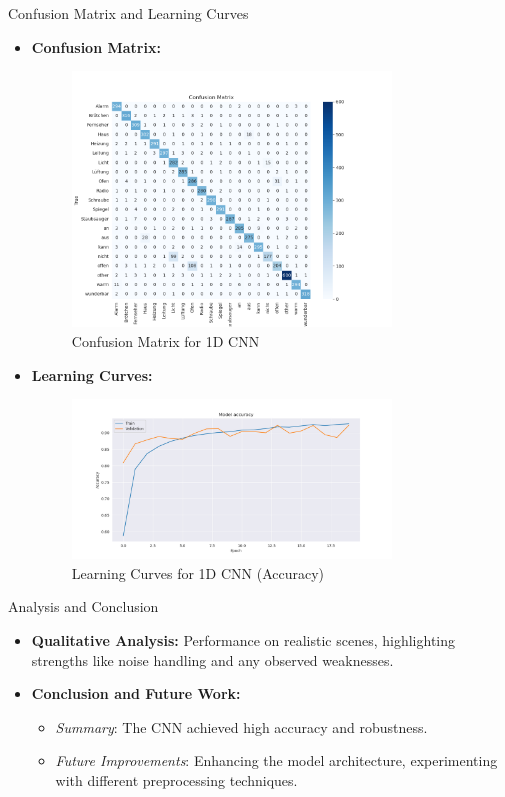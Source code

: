 \documentclass{beamer}
\begin{document}
\begin{frame}{Confusion Matrix and Learning Curves}
  \begin{itemize}
    \item \textbf{Confusion Matrix:}
      \begin{figure}
        \centering
        \includegraphics[width=0.8\textwidth]{fig/confusion_matrix.png}
        \caption{Confusion Matrix for 1D CNN}
      \end{figure}
    \item \textbf{Learning Curves:}
      \begin{figure}
        \centering
        \includegraphics[width=0.8\textwidth]{fig/learning_curves_accuracy.png}
        \caption{Learning Curves for 1D CNN (Accuracy)}
      \end{figure}
  \end{itemize}
\end{frame}

\begin{frame}{Analysis and Conclusion}
  \begin{itemize}
    \item \textbf{Qualitative Analysis:} Performance on realistic scenes, highlighting strengths like noise handling and any observed weaknesses.
    \item \textbf{Conclusion and Future Work:}
      \begin{itemize}
        \item \textit{Summary}: The CNN achieved high accuracy and robustness.
        \item \textit{Future Improvements}: Enhancing the model architecture, experimenting with different preprocessing techniques.
      \end{itemize}
  \end{itemize}
\end{frame}
\end{document}
